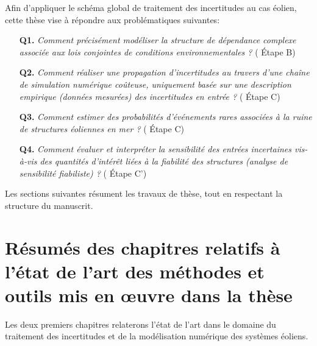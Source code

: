 Afin d'appliquer le schéma global de traitement des incertitudes au cas éolien, cette thèse vise à répondre aux problématiques suivantes:
\begin{itemize}
    \item[\textbf{Q1.}] \textit{
    Comment précisément modéliser la structure de dépendance complexe associée aux lois conjointes de conditions environnementales ?
    } ( \'Etape B)
    \item[\textbf{Q2.}] \textit{
    Comment réaliser une propagation d'incertitudes au travers d'une chaîne de simulation numérique coûteuse, uniquement basée sur une description empirique (données mesurées) des incertitudes en entrée ?
    } ( \'Etape C)
    \item[\textbf{Q3.}] \textit{
    Comment estimer des probabilités d'événements rares associées à la ruine de structures éoliennes en mer ?
    } ( \'Etape C)
    \item[\textbf{Q4.}] \textit{
    Comment évaluer et interpréter la sensibilité des entrées incertaines vis-à-vis des quantités d'intérêt liées à la fiabilité des structures (analyse de sensibilité fiabiliste) ?
    } ( \'Etape C')
\end{itemize}
Les sections suivantes résument les travaux de thèse, tout en respectant la structure du manuscrit. 



\section{Résumés des chapitres relatifs à l'état de l'art des méthodes et outils mis en \oe{}uvre dans la thèse}


Les deux premiers chapitres relaterons l'état de l'art dans le domaine du traitement des incertitudes et de la modélisation numérique des systèmes éoliens. 

